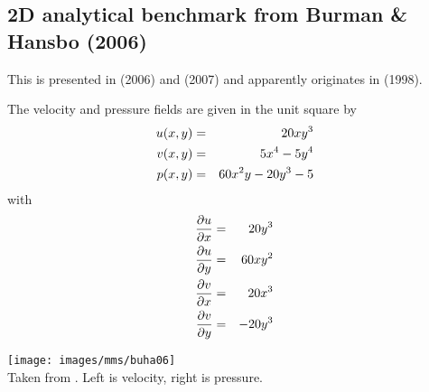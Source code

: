 \subsection{2D analytical benchmark from Burman \& Hansbo (2006)}\label{ss:mms_buha06}

This is presented in \textcite{buha06} (2006) and \textcite{buha07} (2007) and apparently originates 
in \textcite{nosi98} (1998). 

The velocity and pressure fields are given in the unit square by
\begin{eqnarray}
u(x,y) &=& 20xy^3 \nonumber\\
v(x,y) &=& 5x^4-5y^4 \nonumber\\
p(x,y) &=& 60x^2y -20y^3 -5
\end{eqnarray}
with
\begin{eqnarray}
\frac{\partial u }{\partial x} &=& 20y^3 \nonumber\\
\frac{\partial u }{\partial y} &=& 60xy^2 \nonumber\\
\frac{\partial v }{\partial x} &=& 20x^3 \nonumber\\
\frac{\partial v }{\partial y} &=& -20y^3 
\end{eqnarray}

\begin{center}
\texttt{[image: images/mms/buha06]}\\
{\captionfont Taken from \textcite{buha06}. Left is velocity, right is pressure.}
\end{center}

